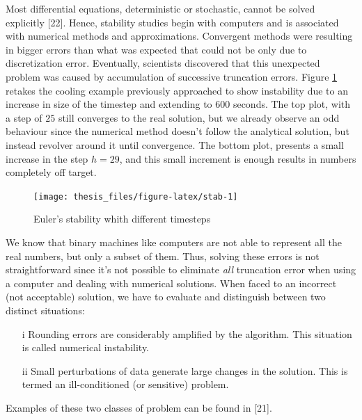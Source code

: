 \documentclass[12pt,twoside]{reedthesis}
\theoremstyle{definition}
\theoremstyle{definition}
\theoremstyle{remark}
\begin{document}
  Most differential equations, deterministic or stochastic, cannot be
  solved explicitly {[}22{]}. Hence, stability studies begin with
  computers and is associated with numerical methods and approximations.
  Convergent methods were resulting in bigger errors than what was
  expected that could not be only due to discretization error. Eventually,
  scientists discovered that this unexpected problem was caused by
  accumulation of successive truncation errors. Figure \ref{fig:stab}
  retakes the cooling example previously approached to show instability
  due to an increase in size of the timestep and extending to \(600\)
  seconds. The top plot, with a step of \(25\) still converges to the real
  solution, but we already observe an odd behaviour since the numerical
  method doesn't follow the analytical solution, but instead revolver
  around it until convergence. The bottom plot, presents a small increase
  in the step \(h = 29\), and this small increment is enough results in
  numbers completely off target.
  \begin{figure}
  
  {\centering \texttt{[image: thesis\_files/figure-latex/stab-1]} 
  
  }
  
  \caption{Euler's stability whith different timesteps \label{stab}}\label{fig:stab}
  \end{figure}
  We know that binary machines like computers are not able to represent
  all the real numbers, but only a subset of them. Thus, solving these
  errors is not straightforward since it's not possible to eliminate
  \emph{all} truncation error when using a computer and dealing with
  numerical solutions. When faced to an incorrect (not acceptable)
  solution, we have to evaluate and distinguish between two distinct
  situations:
  \begin{itemize}
    \item [i] Rounding errors are considerably amplified by the algorithm. This situation is called numerical instability.
    \item [ii] Small perturbations of data generate large changes in the solution. This is termed an ill-conditioned (or sensitive) problem.
  \end{itemize}
  Examples of these two classes of problem can be found in {[}21{]}.
  
\end{document}
